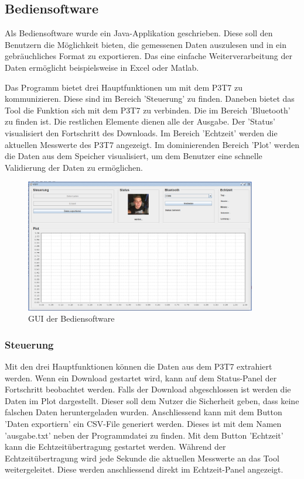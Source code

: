 \subsection{Bediensoftware}%
Als Bediensoftware wurde ein Java-Applikation geschrieben. Diese soll den Benutzern die Möglichkeit bieten, die gemessenen Daten auszulesen und in ein gebräuchliches Format zu exportieren. Das eine einfache Weiterverarbeitung der Daten ermöglicht beispielsweise in Excel oder Matlab.

Das Programm bietet drei Hauptfunktionen um mit dem P3T7 zu kommunizieren. Diese sind im Bereich 'Steuerung' zu finden. Daneben bietet das Tool die Funktion sich mit dem P3T7 zu verbinden. Die im Bereich 'Bluetooth' zu finden ist. Die restlichen Elemente dienen alle der Ausgabe. Der 'Status' visualisiert den Fortschritt des Downloads. Im Bereich 'Echtzeit' werden die aktuellen Messwerte des P3T7 angezeigt. Im dominierenden Bereich 'Plot' werden die Daten aus dem Speicher visualisiert, um dem Benutzer eine schnelle Validierung der Daten zu ermöglichen.

\begin{figure}[H]
\begin{center}
\includegraphics[width=0.9\textwidth]{images/Software_GUI.png}
\caption{GUI der Bediensoftware}
\end{center}
\end{figure}

\subsubsection*{Steuerung}

Mit den drei Hauptfunktionen können die Daten aus dem P3T7 extrahiert werden. Wenn ein Download gestartet wird, kann auf dem Status-Panel der Fortschritt beobachtet werden. Falls der Download abgeschlossen ist werden die Daten im Plot dargestellt. Dieser soll dem Nutzer die Sicherheit geben, dass keine falschen Daten heruntergeladen wurden. Anschliessend kann mit dem Button 'Daten exportiern' ein CSV-File generiert werden. Dieses ist mit dem Namen 'ausgabe.txt' neben der Programmdatei zu finden. Mit dem Button 'Echtzeit' kann die Echtzeitübertragung gestartet werden. Während der Echtzeitübertragung wird jede Sekunde die aktuellen Messwerte an das Tool weitergeleitet. Diese werden anschliessend direkt im Echtzeit-Panel angezeigt.

